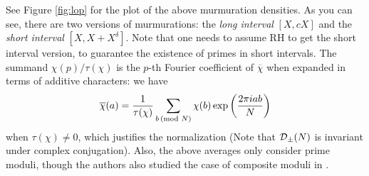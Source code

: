 See Figure \ref{fig:lop} for the plot of the above murmuration densities.
As you can see, there are two versions of murmurations: the \emph{long interval} $[X, cX]$ and the \emph{short interval} $[X, X + X^\delta]$.
Note that one needs to assume RH to get the short interval version, to guarantee the existence of primes in short intervals.
The summand $\chi(p) / \tau(\chi)$ is the $p$-th Fourier coefficient of $\overline{\chi}$ when expanded in terms of additive characters: we have \cite[eq. (3.12)]{iwaniec2021analytic}
\[
\overline{\chi}(a) = \frac{1}{\tau(\chi)} \sum_{b \,(\text{mod }N)} \chi(b) \exp\left(\frac{2 \pi i ab}{N}\right)
\]
when $\tau(\chi) \ne 0$, which justifies the normalization (Note that $\mathcal{D}_\pm(N)$ is invariant under complex conjugation).
Also, the above averages only consider prime moduli, though the authors also studied the case of composite moduli in \cite[Section 6.1]{lee2025murmurations}.

